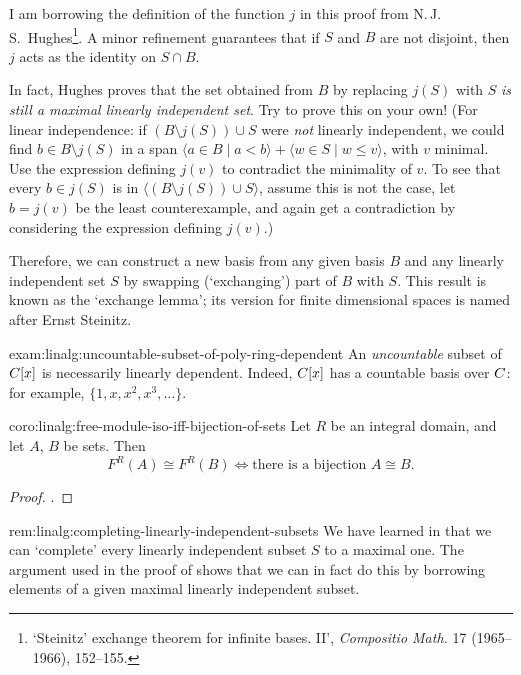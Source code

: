 I am borrowing the definition of the function $j$ in this proof from
N.\,J.\,S.\ Hughes\footnote{`Steinitz' exchange theorem for infinite
  bases. II', \emph{Compositio Math.} 17 (1965--1966), 152--155.}. A
minor refinement guarantees that if $S$ and $B$ are not disjoint, then
$j$ acts as the identity on $S \cap B$.

In fact, Hughes proves that the set obtained from $B$ by replacing
$j(S)$ with $S$ \emph{is still a maximal linearly independent set}.
Try to prove this on your own! (For linear independence: if
$(B \setminus j(S)) \cup S$ were \emph{not} linearly independent, we
could find $b \in B \setminus j(S)$ in a span
$\langle a \in B \mid a < b \rangle + \langle w \in S \mid w \leq v \rangle$,
with $v$ minimal. Use the expression defining $j(v)$ to contradict the
minimality of $v$. To see that every $b \in j(S)$ is in
$\langle (B \setminus j(S)) \cup S \rangle$, assume this is not the
case, let $b = j(v)$ be the least counterexample, and again get a
contradiction by considering the expression defining $j(v)$.)

Therefore, we can construct a new basis from any given basis $B$ and
any linearly independent set $S$ by swapping (`exchanging') part of
$B$ with $S$. This result is known as the `exchange lemma'; its
version for finite dimensional spaces is named after Ernst Steinitz.

\begin{exam}{}{exam:linalg:uncountable-subset-of-poly-ring-dependent}
  An \emph{uncountable} subset of $C[x]$ is necessarily linearly
  dependent. Indeed, $C[x]$ has a countable basis over $C$: for
  example, $\{1, x, x^2, x^3, \dots\}$.
\end{exam}

\begin{coro}{}{coro:linalg:free-module-iso-iff-bijection-of-sets}
  Let $R$ be an integral domain, and let $A$, $B$ be sets. Then
  \[
    F^R(A) \cong F^R(B) \iff \text{there is a bijection } A \cong B.
  \]
\end{coro}
\begin{proof}
  .
\end{proof}

\begin{rem}{}{rem:linalg:completing-linearly-independent-subsets}
  We have learned in
   that we
  can `complete' every linearly independent subset $S$ to a maximal
  one. The argument used in the proof of
   shows that we can in
  fact do this by borrowing elements of a given maximal linearly
  independent subset.
\end{rem}

